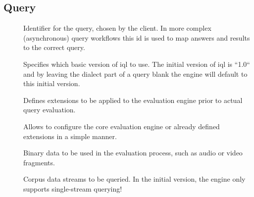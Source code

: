 \documentclass[11pt,a4paper]{article}
\begin{document}
\subsection{Query}
\label{sec:json-ld-query}
\begin{attributes}{}
\end{attributes}
\begin{description}
	\item[] Identifier for the query, chosen by the client. In more complex (asynchronous) query workflows this id is used to map answers and results to the correct query.
	\item[] Specifies which basic version of \ac{iql} to use. The initial version of \ac{iql} is ``1.0`` and by leaving the dialect part of a query blank the engine will default to this initial version.
\end{description}
\begin{elements}{}
\end{elements}
\begin{description}
	\item[] Defines extensions to be applied to the evaluation engine prior to actual query evaluation.
	\item[] Allows to configure the core evaluation engine or already defined extensions in a simple manner.
	\item[] Binary data to be used in the evaluation process, such as audio or video fragments.
	\item[] Corpus data streams to be queried. In the initial version, the engine only supports single-stream querying!
\end{description}
\end{document}
